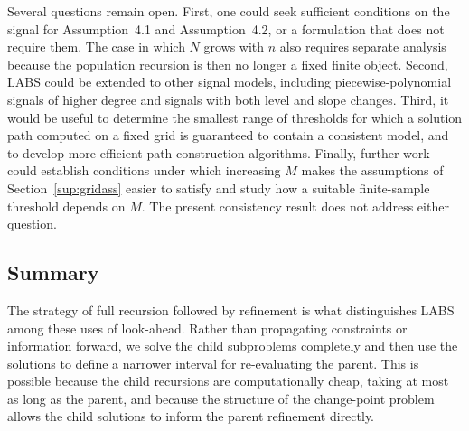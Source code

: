 \documentclass[12pt, a4paper]{article}
\newcommand{\assterm}{Assumption~4.1}
\newcommand{\assnondeg}{Assumption~4.2}
\begin{document}
Several questions remain open. First, one could seek sufficient conditions on the signal for \assterm{} and \assnondeg{}, or a formulation that does not require them. The case in which $N$ grows with $n$ also requires separate analysis because the population recursion is then no longer a fixed finite object. Second, LABS could be extended to other signal models, including piecewise-polynomial signals of higher degree and signals with both level and slope changes. Third, it would be useful to determine the smallest range of thresholds for which a solution path computed on a fixed grid is guaranteed to contain a consistent model, and to develop more efficient path-construction algorithms. Finally, further work could establish conditions under which increasing $M$ makes the assumptions of Section~\ref{sup:gridass} easier to satisfy and study how a suitable finite-sample threshold depends on $M$. The present consistency result does not address either question.

\subsection{Summary}

The strategy of full recursion followed by refinement is what distinguishes LABS among these uses of look-ahead. Rather than propagating constraints or information forward, we solve the child subproblems completely and then use the solutions to define a narrower interval for re-evaluating the parent. This is possible because the child recursions are computationally cheap, taking at most as long as the parent, and because the structure of the change-point problem allows the child solutions to inform the parent refinement directly.
\end{document}
